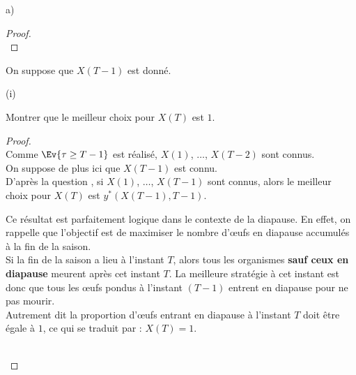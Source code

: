 \documentclass[11pt]{article}%
\begin{document}
\begin{noliste}{a)}
\begin{proof}
      ~\\[-.8cm]
    \end{proof}
    
    \item On suppose que $X(T-1)$ est donné.
    \begin{nonoliste}{(i)}
      \item Montrer que le meilleur choix pour $X(T)$ est $1$.
      
      \begin{proof}~\\
        Comme $\Ev{\tau \geq T-1}$ est réalisé, $X(1)$, $\ldots$, 
        $X(T-2)$ sont connus.\\
        On suppose de plus ici que $X(T-1)$ est connu.\\
        D'après la question , si $X(1)$, $\ldots$, $X(T-1)$
        sont connus, alors le meilleur choix pour $X(T)$ est 
        $y^*(X(T-1),T-1)$.
        
        \begin{remark}
          Ce résultat est parfaitement logique dans le contexte de la 
          diapause. En effet, on rappelle que l'objectif est de 
          maximiser le nombre d'{\oe}ufs en diapause accumulés à la fin 
	  de la saison.\\
          Si la fin de la saison a lieu à l'instant
          $T$, alors tous les organismes {\bf sauf ceux en 
          diapause} meurent après cet instant $T$. La meilleure 
	  stratégie à cet instant est donc 
          que tous les {\oe}ufs pondus à l'instant $(T-1)$ entrent 
          en diapause pour ne pas mourir.\\
          Autrement dit la proportion d'{\oe}ufs entrant en 
          diapause à l'instant $T$ doit être égale à $1$, ce qui se
          traduit par : $X(T)=1$.
        \end{remark}~\\[-1.4cm]
      \end{proof}


\end{nonoliste}
\end{noliste}
\end{document}

